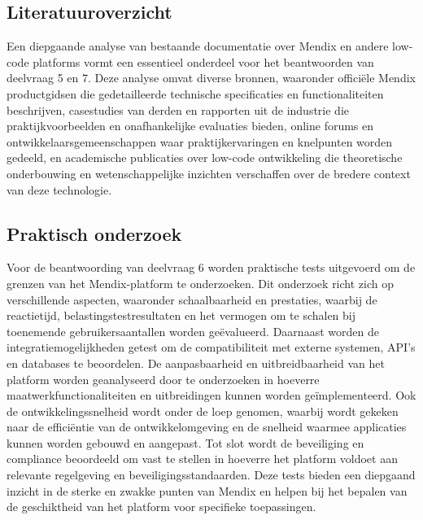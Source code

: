\subsection{Literatuuroverzicht}
Een diepgaande analyse van bestaande documentatie over Mendix en andere low-code platforms vormt een essentieel onderdeel voor het beantwoorden van deelvraag 5 en 7. Deze analyse omvat diverse bronnen, waaronder officiële Mendix productgidsen die gedetailleerde technische specificaties en functionaliteiten beschrijven, casestudies van derden en rapporten uit de industrie die praktijkvoorbeelden en onafhankelijke evaluaties bieden, online forums en ontwikkelaarsgemeenschappen waar praktijkervaringen en knelpunten worden gedeeld, en academische publicaties over low-code ontwikkeling die theoretische onderbouwing en wetenschappelijke inzichten verschaffen over de bredere context van deze technologie.
\subsection{Praktisch onderzoek}
Voor de beantwoording van deelvraag 6 worden praktische tests uitgevoerd om de grenzen van het Mendix-platform te onderzoeken. Dit onderzoek richt zich op verschillende aspecten, waaronder schaalbaarheid en prestaties, waarbij de reactietijd, belastingstestresultaten en het vermogen om te schalen bij toenemende gebruikersaantallen worden geëvalueerd. Daarnaast worden de integratiemogelijkheden getest om de compatibiliteit met externe systemen, API’s en databases te beoordelen. De aanpasbaarheid en uitbreidbaarheid van het platform worden geanalyseerd door te onderzoeken in hoeverre maatwerkfunctionaliteiten en uitbreidingen kunnen worden geïmplementeerd. Ook de ontwikkelingssnelheid wordt onder de loep genomen, waarbij wordt gekeken naar de efficiëntie van de ontwikkelomgeving en de snelheid waarmee applicaties kunnen worden gebouwd en aangepast. Tot slot wordt de beveiliging en compliance beoordeeld om vast te stellen in hoeverre het platform voldoet aan relevante regelgeving en beveiligingsstandaarden. Deze tests bieden een diepgaand inzicht in de sterke en zwakke punten van Mendix en helpen bij het bepalen van de geschiktheid van het platform voor specifieke toepassingen.

